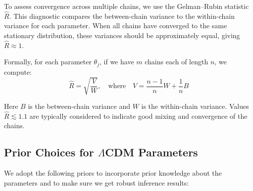 \documentclass[11pt]{article}
\theoremstyle{definition}
\begin{document}
To assess convergence across multiple chains, we use the Gelman--Rubin statistic $\widehat{R}$. This diagnostic compares the between-chain variance to the within-chain variance for each parameter. When all chains have converged to the same stationary distribution, these variances should be approximately equal, giving $\widehat{R} \approx 1$. 

Formally, for each parameter $\theta_j$, if we have $m$ chains each of length $n$, we compute:
\begin{equation}
\widehat{R} = \sqrt{\frac{V}{W}}, \quad \text{where} \quad V = \frac{n-1}{n}W + \frac{1}{n}B
\end{equation}

Here $B$ is the between-chain variance and $W$ is the within-chain variance. Values $\widehat{R}\lesssim1.1$ are typically considered to indicate good mixing and convergence of the chains.







\subsection{Prior Choices for \(\Lambda\)CDM Parameters}

We adopt the following priors to incorporate prior knowledge about the parameters and to make sure we get robust inference results:
\end{document}
